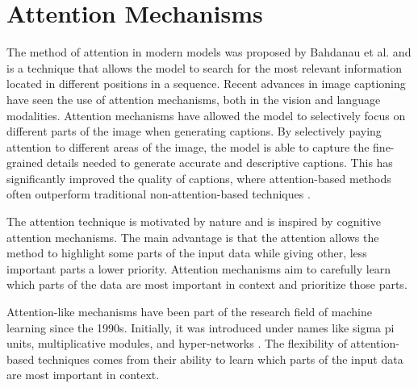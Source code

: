     \section{Attention Mechanisms}
    The method of attention in modern models was proposed by Bahdanau et al. \cite{bahdanauNeuralMachineTranslation2016} and is a technique that allows the model to search for the most relevant information located in different positions in a sequence. Recent advances in image captioning have seen the use of attention mechanisms, both in the vision and language modalities. Attention mechanisms have allowed the model to selectively focus on different parts of the image when generating captions. By selectively paying attention to different areas of the image, the model is able to capture the fine-grained details needed to generate accurate and descriptive captions. This has significantly improved the quality of captions, where attention-based methods often outperform traditional non-attention-based techniques \cite{liEntangledTransformerImage2019}. 
    
    The attention technique is motivated by nature and is inspired by cognitive attention mechanisms. The main advantage is that the attention allows the method to highlight some parts of the input data while giving other, less important parts a lower priority. Attention mechanisms aim to carefully learn which parts of the data are most important in context and prioritize those parts.



    Attention-like mechanisms have been part of the research field of machine learning since the 1990s. Initially, it was introduced under names like sigma pi units, multiplicative modules, and hyper-networks \cite{lecunRNNsGRUsLSTMs2020}. The flexibility of attention-based techniques comes from their ability to learn which parts of the input data are most important in context. 
    
